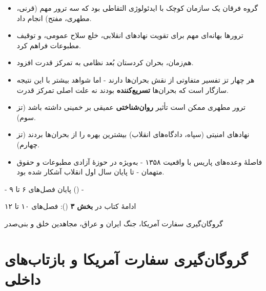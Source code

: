 \documentclass[12pt,a4paper]{book}
\newcommand{\keyword}[1]{\textbf{\textcolor{cPrimary}{#1}}}
\newcommand{\en}[1]{\lr{\textit{#1}}}
\begin{document}
\begin{principleBox}
\begin{itemize}[label=\textcolor{cPrimary}{$\blacksquare$}, rightmargin=2em]
    \item گروه فرقان یک سازمان کوچک با ایدئولوژی التقاطی بود که سه ترور مهم (قرنی، مطهری، مفتح) انجام داد.
    \item ترورها بهانه‌ای مهم برای تقویت نهادهای انقلابی، خلع سلاح عمومی، و توقیف مطبوعات فراهم کرد.
    \item هم‌زمان، بحران کردستان بُعد نظامی به تمرکز قدرت افزود.
    \item هر چهار تز تفسیر متفاوتی از نقش بحران‌ها دارند - اما شواهد بیشتر با این نتیجه سازگار است که بحران‌ها \keyword{تسریع‌کننده} بودند نه علت اصلی تمرکز قدرت.
    \item ترور مطهری ممکن است تأثیر \keyword{روان‌شناختی} عمیقی بر خمینی داشته باشد (تز سوم).
    \item نهادهای امنیتی (سپاه، دادگاه‌های انقلاب) بیشترین بهره را از بحران‌ها بردند (تز چهارم).
    \item فاصلهٔ وعده‌های پاریس با واقعیت ۱۳۵۸ - به‌ویژه در حوزهٔ آزادی مطبوعات و حقوق متهمان - تا پایان سال اول انقلاب آشکار شده بود.
\end{itemize}
\end{principleBox}

\vspace{1cm}

\begin{center}

\vspace{0.5cm}
{\small\color{cGray} - پایان فصل‌های ۶ تا ۹ (\en{Segment 2}) -}

\vspace{0.3cm}
{\small\color{cGray} ادامهٔ کتاب در \textbf{بخش ۳} (\en{Segment 3}): فصل‌های ۱۰ تا ۱۲}

\vspace{0.2cm}
{\small\color{cGray} گروگان‌گیری سفارت آمریکا، جنگ ایران و عراق، مجاهدین خلق و بنی‌صدر}
\end{center}

\chapter{گروگان‌گیری سفارت آمریکا و بازتاب‌های داخلی}
\label{chap:2faf4b}
\end{document}
